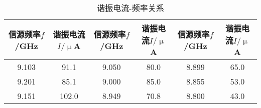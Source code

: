 \begin{table}[htbp!]
	\centering\small
	\caption{谐振电流-频率关系}\label{tab:If}	\begin{tabular}{c||c|c|c|c|c}
		\hline\hline
		信源频率$f$/GHz & 谐振电流$I/\upmu$A & 信源频率$f$/GHz & 谐振电流$I/\upmu$A & 信源频率$f$/GHz & 谐振电流$I/\upmu$A\\		\hline\hline
		9.103 & 91.1 & 9.050 & 80.0 & 8.899 & 65.0\\		\hline
		9.201 & 85.1 & 9.000 & 85.0 & 8.855 & 53.0\\		\hline
		9.151 & 102.0 & 8.949 & 70.8 & 8.800 & 43.0\\		\hline\hline
	\end{tabular}
\end{table}